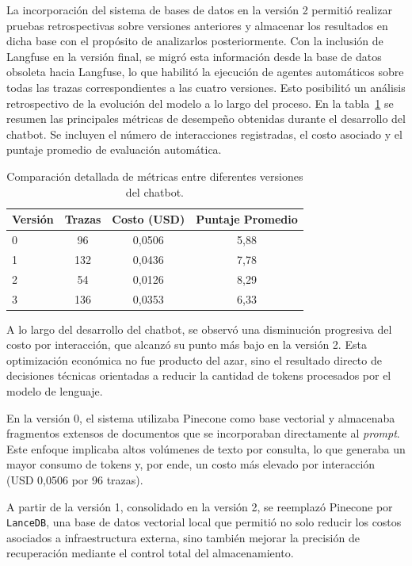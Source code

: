 La incorporación del sistema de bases de datos en la versión 2 permitió realizar pruebas retrospectivas sobre versiones anteriores y almacenar los resultados en dicha base con el propósito de analizarlos posteriormente. Con la inclusión de Langfuse en la versión final, se migró esta información desde la base de datos obsoleta hacia Langfuse, lo que habilitó la ejecución de agentes automáticos sobre todas las trazas correspondientes a las cuatro versiones. Esto posibilitó un análisis retrospectivo de la evolución del modelo a lo largo del proceso. En la tabla~\ref{tab:comparacion_versiones} se resumen las principales métricas de desempeño obtenidas durante el desarrollo del chatbot. Se incluyen el número de interacciones registradas, el costo asociado y el puntaje promedio de evaluación automática.


\begin{table}[h]
    \centering
    \caption[Comparación de versiones del chatbot]{Comparación detallada de métricas entre diferentes versiones del chatbot.}
    \begin{tabular}{l c c c}
        \toprule
        \textbf{Versión} & \textbf{Trazas} & \textbf{Costo (USD)} & \textbf{Puntaje Promedio} \\
        \midrule
        0 & 96  & 0,0506 & 5,88 \\
        1 & 132 & 0,0436 & 7,78 \\
        2 & 54  & 0,0126 & 8,29 \\
        3 & 136 & 0,0353 & 6,33 \\
        \bottomrule
        \hline
    \end{tabular}
    \label{tab:comparacion_versiones}
\end{table}


A lo largo del desarrollo del chatbot, se observó una disminución progresiva del costo por interacción, que alcanzó su punto más bajo en la versión 2. Esta optimización económica no fue producto del azar, sino el resultado directo de decisiones técnicas orientadas a reducir la cantidad de tokens procesados por el modelo de lenguaje.

En la versión 0, el sistema utilizaba Pinecone como base vectorial y almacenaba fragmentos extensos de documentos que se incorporaban directamente al \textit{prompt}. Este enfoque implicaba altos volúmenes de texto por consulta, lo que generaba un mayor consumo de tokens y, por ende, un costo más elevado por interacción (USD 0,0506 por 96 trazas).

A partir de la versión 1, consolidado en la versión 2, se reemplazó Pinecone por \texttt{LanceDB}, una base de datos vectorial local que permitió no solo reducir los costos asociados a infraestructura externa, sino también mejorar la precisión de recuperación mediante el control total del almacenamiento.

